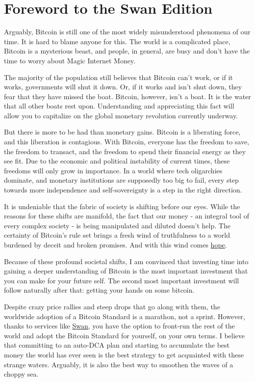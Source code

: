 \chapter*{Foreword to the Swan Edition}

Arguably, Bitcoin is still one of the most widely misunderstood phenomena of our
time. It is hard to blame anyone for this. The world is a complicated place,
Bitcoin is a mysterious beast, and people, in general, are busy and don't have
the time to worry about Magic Internet Money.

The majority of the population still believes that Bitcoin can't work, or if it
works, governments will shut it down. Or, if it works and isn't shut down, they
fear that they have missed the boat. Bitcoin, however, isn't a boat. It is the
water that all other boats rest upon. Understanding and appreciating this fact
will allow you to capitalize on the global monetary revolution currently
underway.

But there is more to be had than monetary gains. Bitcoin is a liberating force,
and this liberation is contagious. With Bitcoin, everyone has the freedom to
save, the freedom to transact, and the freedom to spend their financial energy
as they see fit. Due to the economic and political instability of current times,
these freedoms will only grow in importance. In a world where tech oligarchies
dominate, and monetary institutions are supposedly too big to fail, every step
towards more independence and self-sovereignty is a step in the right direction.

It is undeniable that the fabric of society is shifting before our eyes. While
the reasons for these shifts are manifold, the fact that our money - an integral
tool of every complex society - is being manipulated and diluted doesn't help.
The certainty of Bitcoin's rule set brings a fresh wind of truthfulness to a
world burdened by deceit and broken promises. And with this wind comes
\href{https://hope.com}{hope}.

Because of these profound societal shifts, I am convinced that investing time
into gaining a deeper understanding of Bitcoin is the most important investment
that you can make for your future self. The second most important investment
will follow naturally after that: getting your hands on some bitcoin.

Despite crazy price rallies and steep drops that go along with them, the
worldwide adoption of a Bitcoin Standard is a marathon, not a sprint. However,
thanks to services like \href{https://swanbitcoin.com}{Swan}, you have the
option to front-run the rest of the world and adopt the Bitcoin Standard for
yourself, on your own terms. I believe that committing to an auto-DCA plan and
starting to accumulate the best money the world has ever seen is the best
strategy to get acquainted with these strange waters. Arguably, it is also the
best way to smoothen the waves of a choppy sea.

